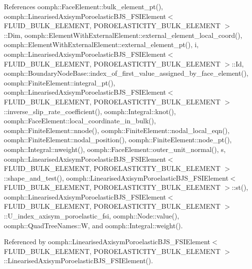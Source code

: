 References oomph\+::\+Face\+Element\+::bulk\+\_\+element\+\_\+pt(), oomph\+::\+Linearised\+Axisym\+Poroelastic\+B\+J\+S\+\_\+\+F\+S\+I\+Element$<$ F\+L\+U\+I\+D\+\_\+\+B\+U\+L\+K\+\_\+\+E\+L\+E\+M\+E\+N\+T, P\+O\+R\+O\+E\+L\+A\+S\+T\+I\+C\+I\+T\+Y\+\_\+\+B\+U\+L\+K\+\_\+\+E\+L\+E\+M\+E\+N\+T $>$\+::\+Dim, oomph\+::\+Element\+With\+External\+Element\+::external\+\_\+element\+\_\+local\+\_\+coord(), oomph\+::\+Element\+With\+External\+Element\+::external\+\_\+element\+\_\+pt(), i, oomph\+::\+Linearised\+Axisym\+Poroelastic\+B\+J\+S\+\_\+\+F\+S\+I\+Element$<$ F\+L\+U\+I\+D\+\_\+\+B\+U\+L\+K\+\_\+\+E\+L\+E\+M\+E\+N\+T, P\+O\+R\+O\+E\+L\+A\+S\+T\+I\+C\+I\+T\+Y\+\_\+\+B\+U\+L\+K\+\_\+\+E\+L\+E\+M\+E\+N\+T $>$\+::\+Id, oomph\+::\+Boundary\+Node\+Base\+::index\+\_\+of\+\_\+first\+\_\+value\+\_\+assigned\+\_\+by\+\_\+face\+\_\+element(), oomph\+::\+Finite\+Element\+::integral\+\_\+pt(), oomph\+::\+Linearised\+Axisym\+Poroelastic\+B\+J\+S\+\_\+\+F\+S\+I\+Element$<$ F\+L\+U\+I\+D\+\_\+\+B\+U\+L\+K\+\_\+\+E\+L\+E\+M\+E\+N\+T, P\+O\+R\+O\+E\+L\+A\+S\+T\+I\+C\+I\+T\+Y\+\_\+\+B\+U\+L\+K\+\_\+\+E\+L\+E\+M\+E\+N\+T $>$\+::inverse\+\_\+slip\+\_\+rate\+\_\+coefficient(), oomph\+::\+Integral\+::knot(), oomph\+::\+Face\+Element\+::local\+\_\+coordinate\+\_\+in\+\_\+bulk(), oomph\+::\+Finite\+Element\+::nnode(), oomph\+::\+Finite\+Element\+::nodal\+\_\+local\+\_\+eqn(), oomph\+::\+Finite\+Element\+::nodal\+\_\+position(), oomph\+::\+Finite\+Element\+::node\+\_\+pt(), oomph\+::\+Integral\+::nweight(), oomph\+::\+Face\+Element\+::outer\+\_\+unit\+\_\+normal(), s, oomph\+::\+Linearised\+Axisym\+Poroelastic\+B\+J\+S\+\_\+\+F\+S\+I\+Element$<$ F\+L\+U\+I\+D\+\_\+\+B\+U\+L\+K\+\_\+\+E\+L\+E\+M\+E\+N\+T, P\+O\+R\+O\+E\+L\+A\+S\+T\+I\+C\+I\+T\+Y\+\_\+\+B\+U\+L\+K\+\_\+\+E\+L\+E\+M\+E\+N\+T $>$\+::shape\+\_\+and\+\_\+test(), oomph\+::\+Linearised\+Axisym\+Poroelastic\+B\+J\+S\+\_\+\+F\+S\+I\+Element$<$ F\+L\+U\+I\+D\+\_\+\+B\+U\+L\+K\+\_\+\+E\+L\+E\+M\+E\+N\+T, P\+O\+R\+O\+E\+L\+A\+S\+T\+I\+C\+I\+T\+Y\+\_\+\+B\+U\+L\+K\+\_\+\+E\+L\+E\+M\+E\+N\+T $>$\+::st(), oomph\+::\+Linearised\+Axisym\+Poroelastic\+B\+J\+S\+\_\+\+F\+S\+I\+Element$<$ F\+L\+U\+I\+D\+\_\+\+B\+U\+L\+K\+\_\+\+E\+L\+E\+M\+E\+N\+T, P\+O\+R\+O\+E\+L\+A\+S\+T\+I\+C\+I\+T\+Y\+\_\+\+B\+U\+L\+K\+\_\+\+E\+L\+E\+M\+E\+N\+T $>$\+::\+U\+\_\+index\+\_\+axisym\+\_\+poroelastic\+\_\+fsi, oomph\+::\+Node\+::value(), oomph\+::\+Quad\+Tree\+Names\+::W, and oomph\+::\+Integral\+::weight().



Referenced by oomph\+::\+Linearised\+Axisym\+Poroelastic\+B\+J\+S\+\_\+\+F\+S\+I\+Element$<$ F\+L\+U\+I\+D\+\_\+\+B\+U\+L\+K\+\_\+\+E\+L\+E\+M\+E\+N\+T, P\+O\+R\+O\+E\+L\+A\+S\+T\+I\+C\+I\+T\+Y\+\_\+\+B\+U\+L\+K\+\_\+\+E\+L\+E\+M\+E\+N\+T $>$\+::\+Linearised\+Axisym\+Poroelastic\+B\+J\+S\+\_\+\+F\+S\+I\+Element().

